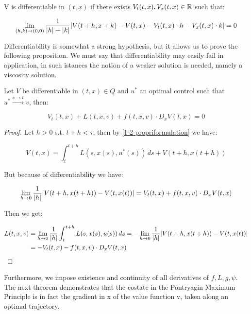 \begin{definition}
    V is differentiable in $(t,x)$ if there exists $V_t(t,x),V_x(t,x)\in\mathbb{R}$ such that:

    \begin{equation}
        \lim_{(h,k)\to(0,0)} \frac{1}{\abs{h}+\abs{k}}\abs{V(t+h,x+k)-V(t,x)-V_t(t,x)\cdot h-V_x(t,x)\cdot k}=0
    \end{equation}
\end{definition}

Differentiability is somewhat a strong hypothesis, but it allows us to prove the following
proposition. We must say that differentiability may easily fail in application, in such istances 
the notion of a weaker solution is needed, namely a viscosity solution.

\begin{theorem}
    Let $V$ be differentiable in $(t,x)\in Q$ and $u^{\ast}$ an optimal control
    such that $u^{\ast}\xrightarrow{s\to t}v$, then:

    \begin{equation}\label{1-3-dynamicprogrammeq}
        V_t(t,x) + L(t,x,v) + f(t,x,v)\cdot D_xV(t,x) = 0
    \end{equation}

    \begin{proof}
        Let $h>0$ s.t. $t+h<\tau$, then by \ref{1-2-propriformulation} we have:

        \[ V(t,x) = \int_t^{t+h} L(s,x(s),u^{\ast}(s)) \,ds + V(t+h,x(t+h))\]

        But because of differentiability we have:

        \[\lim_{h\to0}\frac{1}{\abs{h}}\abs{V(t+h,x(t+h))-V(t,x(t))} = V_t(t,x) + f(t,x,v)\cdot D_xV(t,x)\]

        Then we get:

        \begin{align}
        L(t,x,v) & = \lim_{h\to0} \frac{1}{\abs{h}} \int_t^{t+h} L(s,x(s),u(s)) \,ds = -\lim_{h\to0} \frac{1}{\abs{h}}\abs{V(t+h,x(t+h))-V(t,x(t))} \\
        & = - V_t(t,x) - f(t,x,v)\cdot D_xV(t,x)
        \end{align}
    \end{proof}
\end{theorem}

Furthermore, we impose existence and continuity of all derivatives of $f,L,g,\psi$.
The next theorem demonstrates that the costate in the Pontryagin Maximum
Principle is in fact the gradient in x of the value function v, taken along an optimal
trajectory. 

